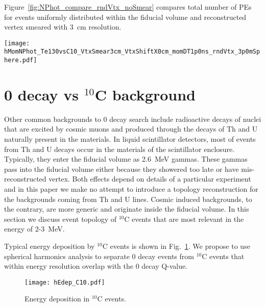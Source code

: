Figure~\ref{fig:NPhot_compare_rndVtx_noSmear} compares total number of PEs for events uniformly
distributed within the fiducial volume and reconstructed vertex smeared with 3~cm resolution.

\begin{figure*}[ht]
  \centering
  \texttt{[image: hMomNPhot\_Te130vsC10\_VtxSmear3cm\_VtxShiftX0cm\_momDT1p0ns\_rndVtx\_3p0mSphere.pdf]}
  \caption{Comparison of total number of early photons between $^{130}$Te 0{\nbb} decay
    and $^{10}$C events with energy deposition in the range between 2.1 and 2.9~MeV.
    Verticies are uniformly distributed within the fiducial volume, $R<3$~m.
    Vetrex is smeared with 3~cm resolution.}
\label{fig:NPhot_compare_rndVtx_Smear3cm}
\end{figure*}





\section{0{\nbb} decay vs $^{10}$C background}

Other common backgrounds to 0{\nbb} decay search include radioactive
decays of nuclei that are excited by cosmic muons and produced through the decays of Th and U
naturally present in the materials. In liquid scintillator detectors,
most of events from Th and U decays occur in the materials of
the scintillator enclosure. Typically, they enter the fiducial volume
as 2.6~MeV gammas. These gammas pass into the fiducial volume either because they showered too late or have
mis-reconstructed vertex. Both effects depend on details of a
particular experiment and in this paper we make no attempt
to introduce a topology reconstruction for the backgrounds coming from
Th and U lines. Cosmic induced backgrounds, to the contrary, are more
generic and originate inside the fiducial volume. In this section we
discuss event topology of $^{10}$C events that are most relevant in the
energy of 2-3~MeV.

Typical energy deposition by $^{10}$C events is shown in
Fig.~\ref{fig:Edep_C10}. We propose to use spherical harmonics
analysis to separate 0{\nbb} decay events from $^{10}$C events that
within energy resolution overlap with the 0{\nbb} decay Q-value.

\begin{figure}[h]
  \centering
  \texttt{[image: hEdep\_C10.pdf]}
  \caption{Energy deposition in $^{10}$C events.}
  \label{fig:Edep_C10}
\end{figure}

